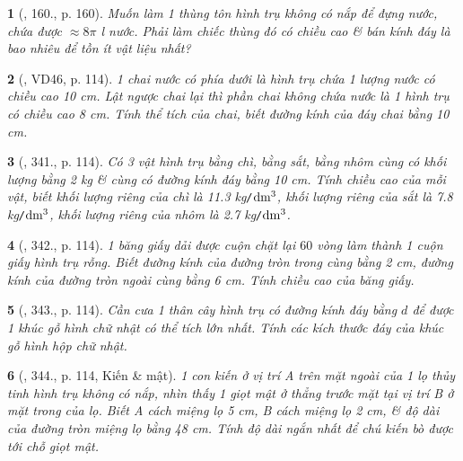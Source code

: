 \documentclass{article}
\newtheorem{baitoan}{}
\begin{document}
\begin{baitoan}[\cite{Tuyen_Toan_9_old}, 160., p. 160]
	Muốn làm 1 thùng tôn hình trụ không có nắp để đựng nước, chứa được $\approx8\pi$ {\rm l} nước. Phải làm chiếc thùng đó có chiều cao \& bán kính đáy là bao nhiêu để tồn ít vật liệu nhất?
\end{baitoan}

\begin{baitoan}[\cite{Binh_Toan_9_tap_2}, VD46, p. 114]
	1 chai nước có phía dưới là hình trụ chứa 1 lượng nước có chiều cao {\rm10 cm}. Lật ngược chai lại thì phần chai không chứa nước là 1 hình trụ có chiều cao {\rm8 cm}. Tính thể tích của chai, biết đường kính của đáy chai bằng {\rm10 cm}.
\end{baitoan}

\begin{baitoan}[\cite{Binh_Toan_9_tap_2}, 341., p. 114]
	Có 3 vật hình trụ bằng chì, bằng sắt, bằng nhôm cùng có khối lượng bằng {\rm2 kg} \& cùng có đường kính đáy bằng {\rm10 cm}. Tính chiều cao của mỗi vật, biết khối lượng riêng của chì là {\rm11.3 kg{\tt/}$\rm dm^3$}, khối lượng riêng của sắt là {\rm7.8 kg{\tt/}$\rm dm^3$}, khối lượng riêng của nhôm là {\rm2.7 kg{\tt/}$\rm dm^3$}.
\end{baitoan}

\begin{baitoan}[\cite{Binh_Toan_9_tap_2}, 342., p. 114]
	1 băng giấy dải được cuộn chặt lại $60$ vòng làm thành 1 cuộn giấy hình trụ rỗng. Biết đường kính của đường tròn trong cùng bằng {\rm2 cm}, đường kính của đường tròn ngoài cùng bằng {\rm6 cm}. Tính chiều cao của băng giấy.
\end{baitoan}

\begin{baitoan}[\cite{Binh_Toan_9_tap_2}, 343., p. 114]
	Cần cưa 1 thân cây hình trụ có đường kính đáy bằng $d$ để được 1 khúc gỗ hình chữ nhật có thể tích lớn nhất. Tính các kích thước đáy của khúc gỗ hình hộp chữ nhật.
\end{baitoan}

\begin{baitoan}[\cite{Binh_Toan_9_tap_2}, 344., p. 114, Kiến \& mật]
	1 con kiến ở vị trí A trên mặt ngoài của 1 lọ thủy tinh hình trụ không có nắp, nhìn thấy 1 giọt mật ở thẳng trước mặt tại vị trí B ở mặt trong của lọ. Biết A cách miệng lọ {\rm5 cm}, B cách miệng lọ {\rm2 cm}, \& độ dài của đường tròn miệng lọ bằng {\rm48 cm}. Tính độ dài ngắn nhất để chú kiến bò được tới chỗ giọt mật.
\end{baitoan}
\end{document}
